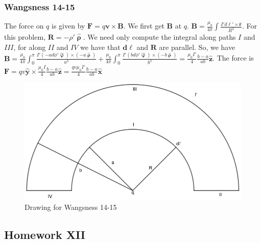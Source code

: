 \documentclass[crop=false,class=article,oneside]{standalone}
\begin{document}
        \subsubsection{Wangsness 14-15}
        The force on $q$ is given by $\mathbf{F} = q\mathbf{v}\times \mathbf{B}$. We first get $\mathbf{B}$ at $q$. $\mathbf{B} = \frac{\mu_0}{4\pi} \int \frac{I' d\ell' \times \hat{\mathbf{r}}}{R^2}$. For this problem, $\mathbf{R} = -\rho' \hat{\boldsymbol{\uprho}}$. We need only compute the integral along paths $I$ and $III$, for along $II$ and $IV$ we have that $\mathbf{d\ell}$ and $\mathbf{R}$ are parallel. So, we have $\mathbf{B} = \frac{\mu_0}{4\pi} \int_{0}^{\pi} \frac{I'(-ad\phi' \hat{\boldsymbol{\upvarphi}})\times (-a\hat{\boldsymbol{\uprho}})}{a^3}+ \frac{\mu_0}{4\pi} \int_{0}^{\pi} \frac{I'(bd\phi' \hat{\boldsymbol{\upvarphi}})\times (-b\hat{\boldsymbol{\uprho}})}{b^3} = \frac{\mu_0 I'}{4} \frac{b-a}{ab} \hat{\mathbf{z}}$. The force is $\mathbf{F} = qv\hat{\mathbf{y}} \times \frac{\mu_0 I}{4} \frac{b-a}{ab} \hat{\mathbf{z}} = \frac{qv\mu_0 I'}{4} \frac{b-a}{ab} \hat{\mathbf{x}}$
        \begin{figure}[htbp]
            \centering
            \captionsetup{type=figure}
            \includegraphics[scale=0.4]{14-15.png}
            \caption{Drawing for Wangsness 14-15}
        \end{figure}
    \subsection{Homework XII}
\end{document}

